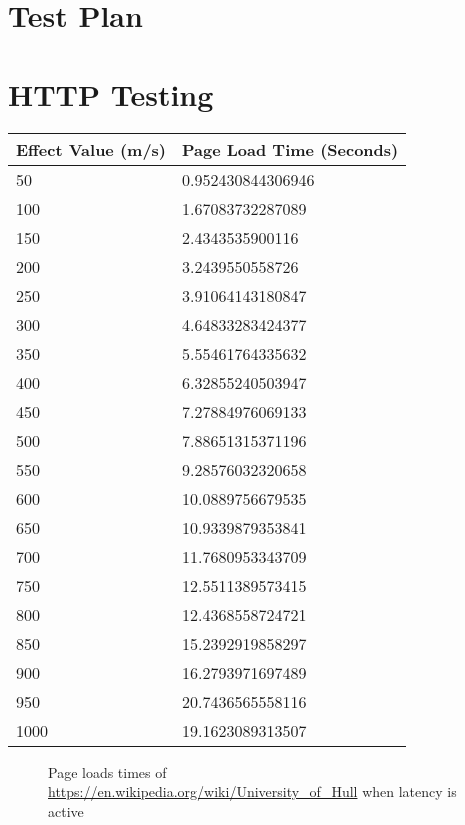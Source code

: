 \begin{appendices}

%
\chapter{Test Plan}
\label{ref:testplan}


\chapter{HTTP Testing}
\label{ref:httpTesting}

\begin{center}


\begin{tabular}{| l | l |}
	\hline
	{\bf Effect Value (m/s)} & {\bf Page Load Time (Seconds)} \\\hline
	50					& 0.952430844306946	 \\\hline
    100					& 1.67083732287089 \\\hline
	150 				& 2.4343535900116 \\\hline
	200					& 3.2439550558726 \\\hline
	250					& 3.91064143180847\\\hline
	300 				& 4.64833283424377\\\hline
	350					& 5.55461764335632\\\hline
	400					& 6.32855240503947\\\hline
	450					& 7.27884976069133\\\hline
	500					& 7.88651315371196\\\hline
	550					& 9.28576032320658\\\hline
	600					& 10.0889756679535\\\hline
	650					& 10.9339879353841\\\hline
	700					& 11.7680953343709\\\hline
	750					& 12.5511389573415\\\hline
	800					& 12.4368558724721\\\hline
	850					& 15.2392919858297\\\hline
	900 				& 16.2793971697489\\\hline
	950					& 20.7436565558116\\\hline
	1000				& 19.1623089313507\\\hline
\end{tabular}
\begin{figure}[h]
	\caption{Page loads times of \url{https://en.wikipedia.org/wiki/University_of_Hull} when latency is active}
	\label{ref:latencyHttp}
\end{figure}
\end{center}


\end{appendices}
